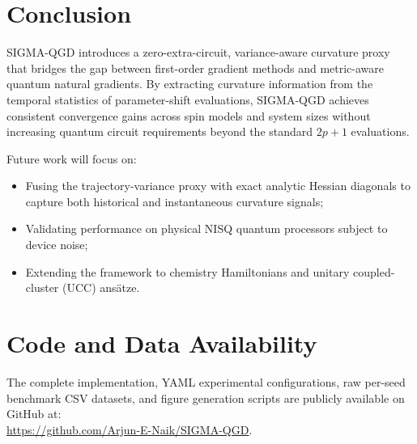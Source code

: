 \documentclass[11pt,a4paper]{article}
\begin{document}
\section{Conclusion}
\label{sec:conclusion}

SIGMA-QGD introduces a zero-extra-circuit, variance-aware curvature proxy that bridges the gap between first-order gradient methods and metric-aware quantum natural gradients. By extracting curvature information from the temporal statistics of parameter-shift evaluations, SIGMA-QGD achieves consistent convergence gains across spin models and system sizes without increasing quantum circuit requirements beyond the standard $2p+1$ evaluations.

Future work will focus on:
\begin{itemize}
    \item Fusing the trajectory-variance proxy with exact analytic Hessian diagonals to capture both historical and instantaneous curvature signals;
    \item Validating performance on physical NISQ quantum processors subject to device noise;
    \item Extending the framework to chemistry Hamiltonians and unitary coupled-cluster (UCC) ans\"atze.
\end{itemize}

\section*{Code and Data Availability}
The complete implementation, YAML experimental configurations, raw per-seed benchmark CSV datasets, and figure generation scripts are publicly available on GitHub at:\\
\url{https://github.com/Arjun-E-Naik/SIGMA-QGD}.
\end{document}
